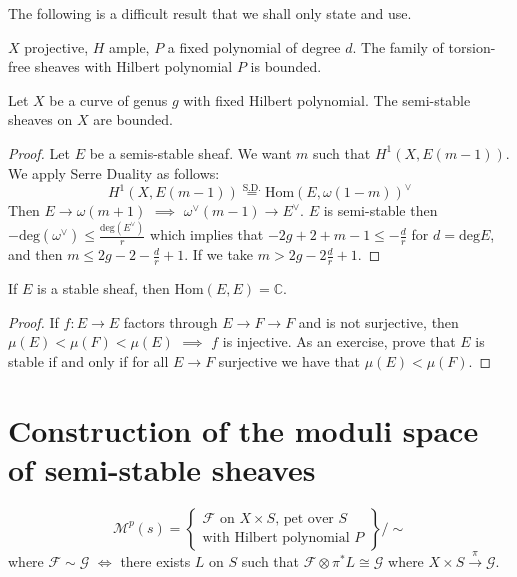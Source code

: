 The following is a difficult result that we shall only state and use.

\begin{theorem}
\label{theorem-}
$X$ projective, $H$ ample, $P$ a fixed polynomial of degree $d$. The family of
torsion-free sheaves with Hilbert polynomial $P$ is bounded.
\end{theorem}

\begin{proposition}
\label{proposition-semi-stable-sheaves-are-bounded-on-curves}
Let $X$ be a curve of genus $g$ with fixed Hilbert polynomial. The semi-stable
sheaves on $X$ are bounded.
\end{proposition}

\begin{proof}
Let $E$ be a semis-stable sheaf. We want $m$ such that $H^{1}(X,E(m-1))$. We
apply Serre Duality as follows:
$$
H^{1}(X,E(m-1))\overset{\text{S.D.}}{=}\text{Hom}(E,\omega(1-m))^\vee
$$Then $E \to \omega(m+1)$ $\implies$ $\omega^\vee(m-1)\to E^\vee$. $E$ is
semi-stable then $-\text{deg}(\omega^\vee)\leq \frac{\text{deg}(E^\vee)}{r}$
which implies that $-2g+2+m-1\leq -\frac{d}{r}$ for $d=\text{deg}E$, and then
$m\leq  2g-2-\frac{d}{r}+1$. If we take $m>2g-2\frac{d}{r}+1$.
\end{proof}

\begin{proposition}
\label{proposition-}
If  $E$ is a stable sheaf, then $\text{Hom}(E,E)=\mathbb{C}$.
\end{proposition}

\begin{proof}
If $f:E \to E$ factors through $E \to F \to F$ and is not surjective, then
$\mu(E)<\mu(F)<\mu(E)$ $\implies$ $f$ is injective. As an exercise, prove that
$E$ is stable if and only if for all $E \to F$ surjective we have that
$\mu(E)<\mu(F)$.
\end{proof}

\section{Construction of the moduli space of semi-stable sheaves}
\label{section-construction-of-the-moduli-space-of-semi-stable-sheaves}
$$
\mathcal{M}^p(s)=\left\{ \substack{\text{$\mathcal{F}$ on $X\times S$,
pet over $S$}
 \\ \text{with Hilbert polynomial $P$}} \right\} \Big/\sim
$$
where $\mathcal{F}\sim \mathcal{G}$ $\iff$ there exists $L$ on $S$ such that
$\mathcal{F}\otimes \pi^*L \cong \mathcal{G}$ where 
$X \times S\xrightarrow{\pi}\mathcal{G}$.

